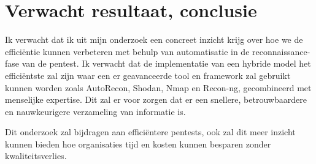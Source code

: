 


\section{Verwacht resultaat, conclusie}%
\label{sec:verwachte_resultaten}




Ik verwacht dat ik uit mijn onderzoek een concreet inzicht krijg over hoe we de efficiëntie kunnen verbeteren met behulp van
automatisatie in de reconnaissance-fase van de pentest. Ik verwacht dat de implementatie van een hybride model het efficiëntste
zal zijn waar een er geavanceerde tool en framework zal gebruikt kunnen worden zoals AutoRecon, Shodan, Nmap en Recon-ng,
gecombineerd met menselijke expertise. Dit zal er voor zorgen dat er een snellere, betrouwbaardere en nauwkeurigere verzameling van informatie is.

Dit onderzoek zal bijdragen aan efficiëntere pentests, ook zal dit meer inzicht kunnen bieden hoe organisaties tijd en kosten
kunnen besparen zonder kwaliteitsverlies.

